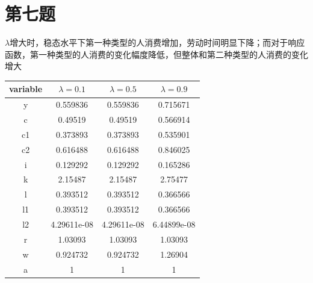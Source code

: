 \documentclass[a4paper,12pt]{ctexart}
\begin{document}
\section*{第七题}
$\lambda$增大时，稳态水平下第一种类型的人消费增加，劳动时间明显下降；而对于响应函数，第一种类型的人消费的变化幅度降低，但整体和第二种类型的人消费的变化增大
\begin{table}[H]
    \centering
    \begin{tabular}{c|c|c|c}
        variable & $\lambda=0.1$ & $\lambda=0.5$ & $\lambda=0.9$ \\\hline
        y        & 0.559836      & 0.559836      & 0.715671      \\
        c        & 0.49519       & 0.49519       & 0.566914      \\
        c1       & 0.373893      & 0.373893      & 0.535901      \\
        c2       & 0.616488      & 0.616488      & 0.846025      \\
        i        & 0.129292      & 0.129292      & 0.165286      \\
        k        & 2.15487       & 2.15487       & 2.75477       \\
        l        & 0.393512      & 0.393512      & 0.366566      \\
        l1       & 0.393512      & 0.393512      & 0.366566      \\
        l2       & 4.29611e-08   & 4.29611e-08   & 6.44899e-08   \\
        r        & 1.03093       & 1.03093       & 1.03093       \\
        w        & 0.924732      & 0.924732      & 1.26904       \\
        a        & 1             & 1             & 1             \\
    \end{tabular}
\end{table}
\end{document}
